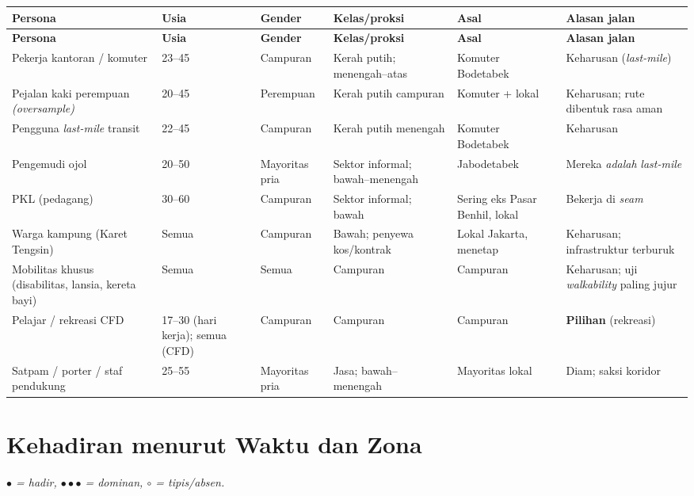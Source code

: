 \documentclass[11pt,a4paper]{report}
\begin{document}
\begin{longtable}{@{}p{2.6cm}p{1.7cm}p{1.6cm}p{2.4cm}p{2.3cm}p{2.1cm}@{}}
\toprule
\textbf{Persona} & \textbf{Usia} & \textbf{Gender} & \textbf{Kelas/proksi} & \textbf{Asal} & \textbf{Alasan jalan} \\
\midrule
\endfirsthead
\toprule
\textbf{Persona} & \textbf{Usia} & \textbf{Gender} & \textbf{Kelas/proksi} & \textbf{Asal} & \textbf{Alasan jalan} \\
\midrule
\endhead
Pekerja kantoran / komuter & 23--45 & Campuran & Kerah putih; menengah--atas & Komuter Bodetabek & Keharusan (\emph{last-mile}) \\
\addlinespace
Pejalan kaki perempuan \emph{(oversample)} & 20--45 & Perempuan & Kerah putih campuran & Komuter + lokal & Keharusan; rute dibentuk rasa aman \\
\addlinespace
Pengguna \emph{last-mile} transit & 22--45 & Campuran & Kerah putih menengah & Komuter Bodetabek & Keharusan \\
\addlinespace
Pengemudi ojol & 20--50 & Mayoritas pria & Sektor informal; bawah--menengah & Jabodetabek & Mereka \emph{adalah} \emph{last-mile} \\
\addlinespace
PKL (pedagang) & 30--60 & Campuran & Sektor informal; bawah & Sering eks Pasar Benhil, lokal & Bekerja di \emph{seam} \\
\addlinespace
Warga kampung (Karet Tengsin) & Semua & Campuran & Bawah; penyewa kos/kontrak & Lokal Jakarta, menetap & Keharusan; infrastruktur terburuk \\
\addlinespace
Mobilitas khusus (disabilitas, lansia, kereta bayi) & Semua & Semua & Campuran & Campuran & Keharusan; uji \emph{walkability} paling jujur \\
\addlinespace
Pelajar / rekreasi CFD & 17--30 (hari kerja); semua (CFD) & Campuran & Campuran & Campuran & \textbf{Pilihan} (rekreasi) \\
\addlinespace
Satpam / porter / staf pendukung & 25--55 & Mayoritas pria & Jasa; bawah--menengah & Mayoritas lokal & Diam; saksi koridor \\
\bottomrule
\end{longtable}

\section{Kehadiran menurut Waktu dan Zona}
\emph{$\bullet$ = hadir, $\bullet\bullet\bullet$ = dominan, $\circ$ = tipis/absen.}
\end{document}
